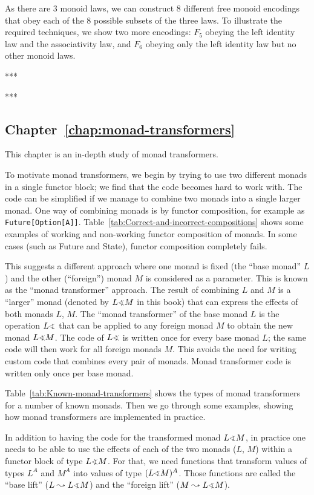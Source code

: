 As there are 3 monoid laws, we can construct 8 different free monoid
encodings that obey each of the 8 possible subsets of the three laws.
To illustrate the required techniques, we show two more encodings:
$F_{5}$ obeying the left identity law and the associativity law,
and $F_{6}$ obeying only the left identity law but no other monoid
laws.

{*}{*}{*} 

{*}{*}{*}

\subsection{Chapter~\ref{chap:monad-transformers}}

This chapter is an in-depth study of monad transformers.

To motivate monad transformers, we begin by trying to use two different
monads in a single functor block; we find that the code becomes hard
to work with. The code can be simplified if we manage to combine two
monads into a single larger monad. One way of combining monads is
by functor composition, for example as \lstinline!Future[Option[A]]!.
Table~\ref{tab:Correct-and-incorrect-compositions} shows some examples
of working and non-working functor composition of monads. In some
cases (such as Future and State), functor composition completely fails.

This suggests a different approach where one monad is fixed (the \textsf{``}base
monad\textsf{''} $L$) and the other (\textsf{``}foreign\textsf{''}) monad $M$ is considered
as a parameter. This is known as the \textsf{``}monad transformer\textsf{''} approach.
The result of combining $L$ and $M$ is a \textsf{``}larger\textsf{''} monad (denoted
by $L\varangle M$ in this book) that can express the effects of both
monads $L$, $M$. The \textsf{``}monad transformer\textsf{''} of the base monad $L$
is the operation $L\varangle$ that can be applied to any foreign
monad $M$ to obtain the new monad $L\varangle M$. The code of $L\varangle$
is written once for every base monad $L$; the same code will then
work for all foreign monads $M$. This avoids the need for writing
custom code that combines every pair of monads. Monad transformer
code is written only once per base monad. 

Table~\ref{tab:Known-monad-transformers} shows the types of monad
transformers for a number of known monads. Then we go through some
examples, showing how monad transformers are implemented in practice.

In addition to having the code for the transformed monad $L\varangle M$,
in practice one needs to be able to use the effects of each of the
two monads ($L$, $M$) within a functor block of type $L\varangle M$.
For that, we need functions that transform values of types $L^{A}$
and $M^{A}$ into values of type $(L\varangle M)^{A}$. Those functions
are called the \textsf{``}base lift\textsf{''} ($L\leadsto L\varangle M$) and the
\textsf{``}foreign lift\textsf{''} ($M\leadsto L\varangle M$). 

